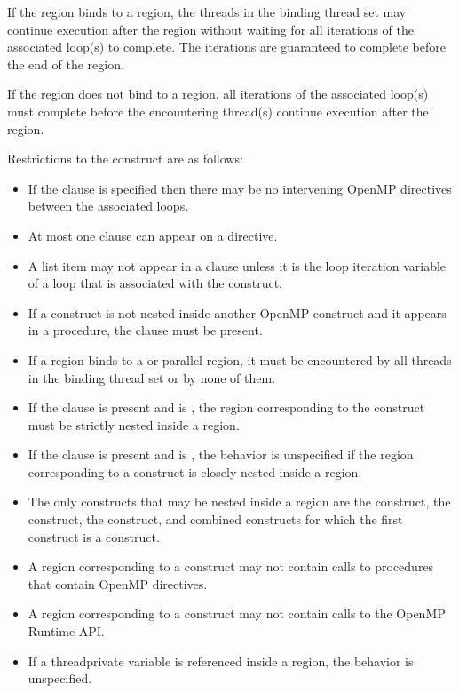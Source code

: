 If the  region binds to a  region, the threads in the
binding thread set may continue execution after the  region without
waiting for all iterations of the associated loop(s) to complete. The
iterations are guaranteed to complete before the end of the  region.

If the  region does not bind to a  region, all
iterations of the associated loop(s) must complete before the encountering
thread(s) continue execution after the  region.

\restrictions
Restrictions to the  construct are as follows:

\begin{itemize}
\item If the  clause is specified then there may be no intervening 
      OpenMP directives between the associated loops.
\item At most one  clause can appear on a  directive.
\item A list item may not appear in a  clause unless it
      is the loop iteration variable of a loop that is associated with the
      construct.
\item If a  construct is not nested inside another OpenMP
      construct and it appears in a procedure, the
       clause must be present.
\item If a  region binds to a  or parallel
      region, it must be encountered by all threads in the binding thread set
      or by none of them.
\item If the  clause is present and  is ,
      the  region corresponding to the  construct must be
      strictly nested inside a  region.
\item If the  clause is present and  is ,
      the behavior is unspecified if the  region corresponding to a
       construct is closely nested inside a  region.
\item The only constructs that may be nested inside a  region
      are the  construct, the  construct, the
       construct, and combined constructs for which the first
      construct is a  construct.
\item A  region corresponding to a  construct may not
      contain calls to procedures that contain OpenMP directives. 
\item A  region corresponding to a  construct may not
      contain calls to the OpenMP Runtime API.
\item If a threadprivate variable is referenced inside a  region, 
      the behavior is unspecified.
\end{itemize}

